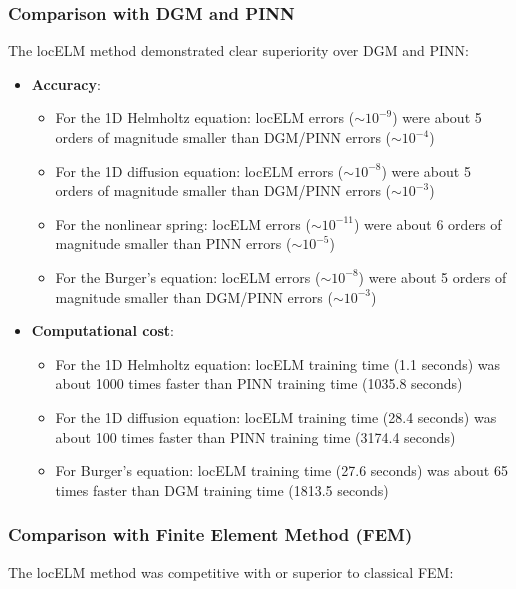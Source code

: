 \documentclass[11pt,a4paper]{article}
\begin{document}
\subsubsection{Comparison with DGM and PINN}
The locELM method demonstrated clear superiority over DGM and PINN:

\begin{itemize}
    \item \textbf{Accuracy}: 
    \begin{itemize}
        \item For the 1D Helmholtz equation: locELM errors ($\sim 10^{-9}$) were about 5 orders of magnitude smaller than DGM/PINN errors ($\sim 10^{-4}$)
        \item For the 1D diffusion equation: locELM errors ($\sim 10^{-8}$) were about 5 orders of magnitude smaller than DGM/PINN errors ($\sim 10^{-3}$)
        \item For the nonlinear spring: locELM errors ($\sim 10^{-11}$) were about 6 orders of magnitude smaller than PINN errors ($\sim 10^{-5}$)
        \item For the Burger's equation: locELM errors ($\sim 10^{-8}$) were about 5 orders of magnitude smaller than DGM/PINN errors ($\sim 10^{-3}$)
    \end{itemize}
    
    \item \textbf{Computational cost}:
    \begin{itemize}
        \item For the 1D Helmholtz equation: locELM training time (1.1 seconds) was about 1000 times faster than PINN training time (1035.8 seconds)
        \item For the 1D diffusion equation: locELM training time (28.4 seconds) was about 100 times faster than PINN training time (3174.4 seconds)
        \item For Burger's equation: locELM training time (27.6 seconds) was about 65 times faster than DGM training time (1813.5 seconds)
    \end{itemize}
\end{itemize}

\subsubsection{Comparison with Finite Element Method (FEM)}
The locELM method was competitive with or superior to classical FEM:
\end{document}
